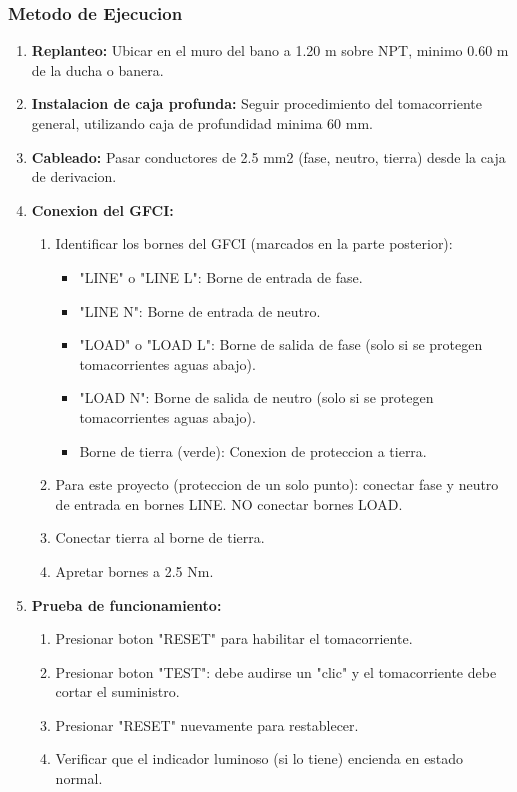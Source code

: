 \subsubsection{Metodo de Ejecucion}

\begin{enumerate}
  \item \textbf{Replanteo:} Ubicar en el muro del bano a 1.20 m sobre NPT, minimo 0.60 m de la ducha o banera.
  \item \textbf{Instalacion de caja profunda:} Seguir procedimiento del tomacorriente general, utilizando caja de profundidad minima 60 mm.
  \item \textbf{Cableado:} Pasar conductores de 2.5 mm2 (fase, neutro, tierra) desde la caja de derivacion.
  \item \textbf{Conexion del GFCI:}
  \begin{enumerate}
    \item Identificar los bornes del GFCI (marcados en la parte posterior):
    \begin{itemize}
      \item "LINE" o "LINE L": Borne de entrada de fase.
      \item "LINE N": Borne de entrada de neutro.
      \item "LOAD" o "LOAD L": Borne de salida de fase (solo si se protegen tomacorrientes aguas abajo).
      \item "LOAD N": Borne de salida de neutro (solo si se protegen tomacorrientes aguas abajo).
      \item Borne de tierra (verde): Conexion de proteccion a tierra.
    \end{itemize}
    \item Para este proyecto (proteccion de un solo punto): conectar fase y neutro de entrada en bornes LINE. NO conectar bornes LOAD.
    \item Conectar tierra al borne de tierra.
    \item Apretar bornes a 2.5 Nm.
  \end{enumerate}
  \item \textbf{Prueba de funcionamiento:}
  \begin{enumerate}
    \item Presionar boton "RESET" para habilitar el tomacorriente.
    \item Presionar boton "TEST": debe audirse un "clic" y el tomacorriente debe cortar el suministro.
    \item Presionar "RESET" nuevamente para restablecer.
    \item Verificar que el indicador luminoso (si lo tiene) encienda en estado normal.
  \end{enumerate}
\end{enumerate}

